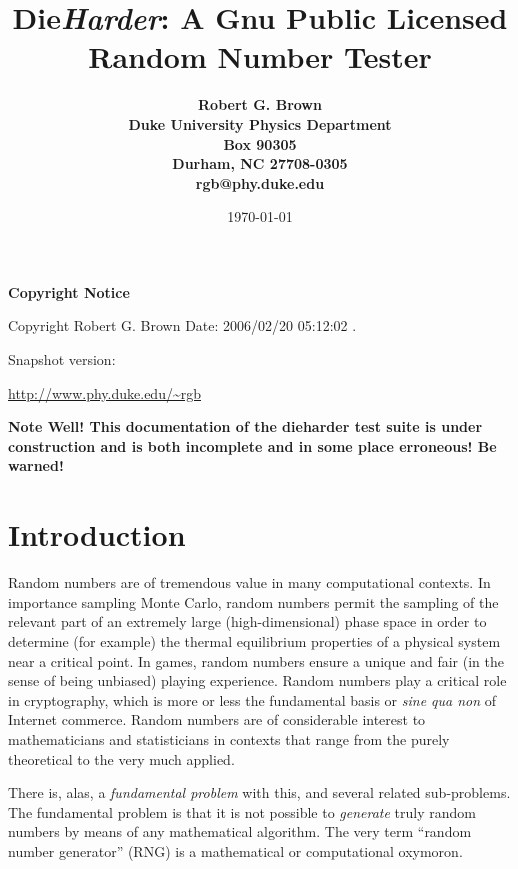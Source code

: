 \documentclass[12pt]{article}
\begin{document}
\title{Die{\em Harder}: A Gnu Public Licensed Random Number Tester}

\date{\today}

\author{\bf Robert G. Brown \\
Duke University Physics Department \\
Box 90305 \\
Durham, NC 27708-0305 \\
rgb@phy.duke.edu}

\maketitle

\vspace*{\fill}

\centerline{\large \bf Copyright Notice}
\centerline{Copyright Robert G. Brown 
$ $Date: 2006/02/20 05:12:02 $.$ }
\centerline{Snapshot version: \version}
\url{http://www.phy.duke.edu/~rgb}

\newpage

\tableofcontents

\newpage

{\large \bf Note Well!  This documentation of the dieharder test suite
is under construction and is both incomplete and in some place
erroneous!  Be warned!}

\section{Introduction}

Random numbers are of tremendous value in many computational contexts.
In importance sampling Monte Carlo, random numbers permit the sampling
of the relevant part of an extremely large (high-dimensional) phase
space in order to determine (for example) the thermal equilibrium
properties of a physical system near a critical point.  In games, random
numbers ensure a unique and fair (in the sense of being unbiased)
playing experience.  Random numbers play a critical role in
cryptography, which is more or less the fundamental basis or {\em sine
qua non} of Internet commerce.  Random numbers are of considerable
interest to mathematicians and statisticians in contexts that range from
the purely theoretical to the very much applied.

There is, alas, a {\em fundamental problem} with this, and several
related sub-problems.  The fundamental problem is that it is not
possible to {\em generate} truly random numbers by means of any
mathematical algorithm.  The very term ``random number generator'' (RNG)
is a mathematical or computational oxymoron.  
\end{document}
